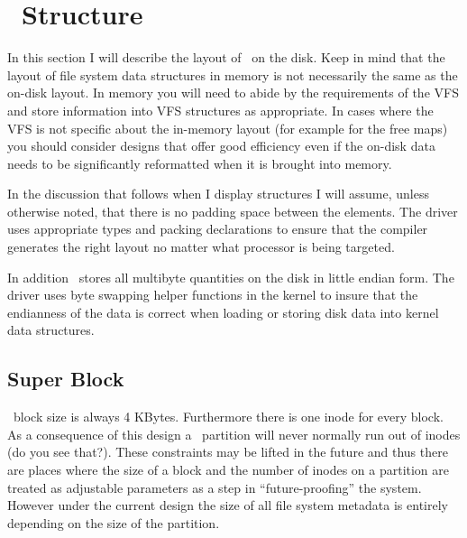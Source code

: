 %
%
%
%

\section{\GenericFS\ Structure}
\label{sec:structure}

In this section I will describe the layout of \GenericFS\ on the disk. Keep in mind that the
layout of file system data structures in memory is not necessarily the same as the on-disk
layout. In memory you will need to abide by the requirements of the VFS and store information
into VFS structures as appropriate. In cases where the VFS is not specific about the in-memory
layout (for example for the free maps) you should consider designs that offer good efficiency
even if the on-disk data needs to be significantly reformatted when it is brought into memory.

In the discussion that follows when I display structures I will assume, unless otherwise noted,
that there is no padding space between the elements. The driver uses appropriate types and
packing declarations to ensure that the compiler generates the right layout no matter what
processor is being targeted.

In addition \GenericFS\ stores all multibyte quantities on the disk in little endian form. The
driver uses byte swapping helper functions in the kernel to insure that the endianness of the
data is correct when loading or storing disk data into kernel data structures.

\subsection{Super Block}
\label{sec:structure-superblock}

\GenericFS\ block size is always 4 KBytes. Furthermore there is one inode for every block. As a
consequence of this design a \GenericFS\ partition will never normally run out of inodes (do you
see that?). These constraints may be lifted in the future and thus there are places where the
size of a block and the number of inodes on a partition are treated as adjustable parameters
as a step in ``future-proofing'' the system. However under the current design the size of all
file system metadata is entirely depending on the size of the partition.

